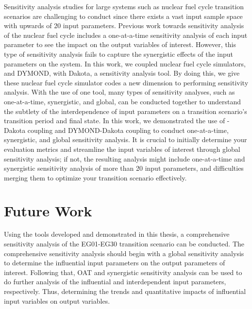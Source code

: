 Sensitivity analysis studies for large systems such as nuclear 
fuel cycle transition scenarios are challenging to conduct 
since there exists a vast input sample space with
upwards of 20 input parameters. 
Previous work towards sensitivity analysis of the nuclear fuel cycle 
includes a one-at-a-time sensitivity analysis of each input parameter 
to see the impact on the output variables of interest.
However, this type of sensitivity analysis fails to capture the 
synergistic effects of the input parameters on the system.  
In this work, we coupled nuclear fuel cycle simulators, \Cyclus and 
DYMOND, with Dakota, a sensitivity analysis tool. 
By doing this, we give these nuclear fuel cycle simulator codes 
a new dimension to performing sensitivity analysis.
With the use of one tool, many types of sensitivity analyses, 
such as one-at-a-time, synergistic, and global, 
can be conducted together to understand the subtlety of the 
interdependence of input parameters on a transition scenario's 
transition period and final state. 
In this work, we demonstrated the use of \Cyclus-Dakota coupling 
and DYMOND-Dakota coupling to conduct one-at-a-time, synergistic, and 
global sensitivity analysis. 
It is crucial to initially determine your evaluation metrics and 
streamline the input variables of interest through global sensitivity 
analysis; if not, the resulting analysis might include one-at-a-time and 
synergistic sensitivity analysis of more than 20 input parameters, 
and difficulties merging them to optimize your transition scenario 
effectively.

\section{Future Work}
Using the tools developed and demonstrated in this thesis, a comprehensive 
sensitivity analysis of the EG01-EG30 transition scenario can be conducted. 
The comprehensive sensitivity analysis should begin with a global
sensitivity analysis to determine the influential input parameters 
on the output parameters of interest. 
Following that, OAT and synergistic sensitivity analysis can be used to do 
further analysis of the influential and interdependent input parameters, respectively. 
Thus, determining the trends and quantitative impacts of influential input 
variables on output variables.  
